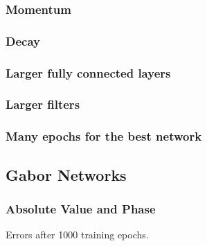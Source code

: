 \documentclass[11pt, a4paper]{article}
\begin{document}
\subsubsection{Momentum}

\subsubsection{Decay}

\subsubsection{Larger fully connected layers}

\subsubsection{Larger filters}

\subsubsection{Many epochs for the best network}


\subsection{Gabor Networks}
\label{subsec:results_gabornetworks}

\subsubsection{Absolute Value and Phase}

Errors after 1000 training epochs.
\end{document}
